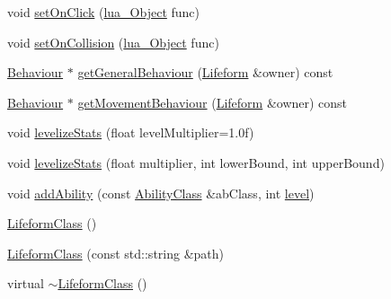 \begin{DoxyCompactItemize}
\item 
void \hyperlink{classZeta_1_1LifeformClass_a138bb3ccc7206b6db397cb680ed37aba}{set\+On\+Click} (\hyperlink{ZetaConfig_8hpp_ae7be32b73848041a60f2412f72bbb221}{lua\+\_\+\+Object} func)
\item 
void \hyperlink{classZeta_1_1LifeformClass_a92551e5adaa9a0ee11b46e89e8045f80}{set\+On\+Collision} (\hyperlink{ZetaConfig_8hpp_ae7be32b73848041a60f2412f72bbb221}{lua\+\_\+\+Object} func)
\item 
\hyperlink{classZeta_1_1Behaviour}{Behaviour} $\ast$ \hyperlink{classZeta_1_1LifeformClass_a39369e2a337ae6d01dbd0a9ae3b38df3}{get\+General\+Behaviour} (\hyperlink{classZeta_1_1Lifeform}{Lifeform} \&owner) const 
\item 
\hyperlink{classZeta_1_1Behaviour}{Behaviour} $\ast$ \hyperlink{classZeta_1_1LifeformClass_a83a72d25a5124ca4160f55c84dc1a6e9}{get\+Movement\+Behaviour} (\hyperlink{classZeta_1_1Lifeform}{Lifeform} \&owner) const 
\item 
void \hyperlink{classZeta_1_1LifeformClass_abcb3777fac723d397f8c1574a3a05f20}{levelize\+Stats} (float level\+Multiplier=1.\+0f)
\item 
void \hyperlink{classZeta_1_1LifeformClass_a114502043e6f3740306a8a5dcf315d9b}{levelize\+Stats} (float multiplier, int lower\+Bound, int upper\+Bound)
\item 
void \hyperlink{classZeta_1_1LifeformClass_a9e08aa445c26953e8c22edf168cc633d}{add\+Ability} (const \hyperlink{classZeta_1_1AbilityClass}{Ability\+Class} \&ab\+Class, int \hyperlink{classZeta_1_1LifeformClass_ab00327ecb94395422bc02d9ff5c7bfb3}{level})
\item 
\hyperlink{classZeta_1_1LifeformClass_a7bd16a6d2e48cd98fdb0ab0551c4b025}{Lifeform\+Class} ()
\item 
\hyperlink{classZeta_1_1LifeformClass_ac713077ce7ce46f5398f63749d1e82af}{Lifeform\+Class} (const std\+::string \&path)
\item 
virtual \hyperlink{classZeta_1_1LifeformClass_aea0a4184fe494b04d1bd4f9551e02359}{$\sim$\+Lifeform\+Class} ()
\end{DoxyCompactItemize}
